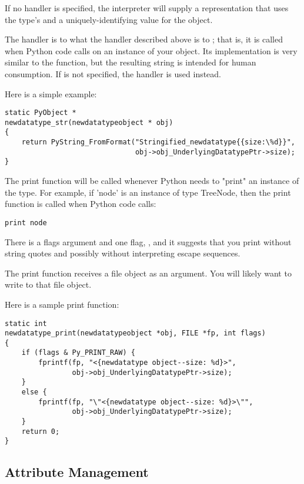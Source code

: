 If no  handler is specified, the interpreter will
supply a representation that uses the type's  and a
uniquely-identifying value for the object.

The  handler is to  what the
 handler described above is to ; that
is, it is called when Python code calls  on an
instance of your object.  Its implementation is very similar to the
 function, but the resulting string is intended for
human consumption.  If  is not specified, the
 handler is used instead.

Here is a simple example:

\begin{verbatim}
static PyObject *
newdatatype_str(newdatatypeobject * obj)
{
    return PyString_FromFormat("Stringified_newdatatype{{size:\%d}}",
                               obj->obj_UnderlyingDatatypePtr->size);
}
\end{verbatim}

The print function will be called whenever Python needs to "print" an
instance of the type.  For example, if 'node' is an instance of type
TreeNode, then the print function is called when Python code calls:

\begin{verbatim}
print node
\end{verbatim}

There is a flags argument and one flag, , and
it suggests that you print without string quotes and possibly without
interpreting escape sequences.

The print function receives a file object as an argument. You will
likely want to write to that file object.

Here is a sample print function:

\begin{verbatim}
static int
newdatatype_print(newdatatypeobject *obj, FILE *fp, int flags)
{
    if (flags & Py_PRINT_RAW) {
        fprintf(fp, "<{newdatatype object--size: %d}>",
                obj->obj_UnderlyingDatatypePtr->size);
    }
    else {
        fprintf(fp, "\"<{newdatatype object--size: %d}>\"",
                obj->obj_UnderlyingDatatypePtr->size);
    }
    return 0;
}
\end{verbatim}


\subsection{Attribute Management}

